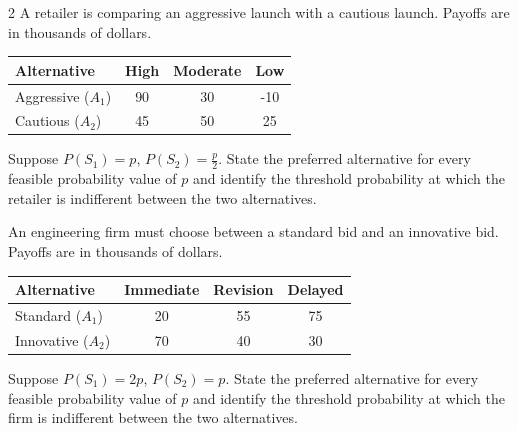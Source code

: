 \begin{multicols}{2}
		A retailer is comparing an aggressive launch with a cautious launch. Payoffs are in thousands of dollars.
		\begin{center}\setlength{\tabcolsep}{2pt}\renewcommand{\arraystretch}{1.15}
			\begin{tabular}{lccc}\toprule
				Alternative&High&Moderate&Low\\ \midrule
				Aggressive ($A_1$)&90&30&-10\\
				Cautious ($A_2$)&45&50&25\\ \bottomrule
			\end{tabular}
		\end{center}\vspace{-3mm}
		Suppose $P(S_1)=p$, $P(S_2)=\frac{p}{2}$. State the preferred alternative for every feasible probability value of $p$ and identify the threshold probability at which the retailer is indifferent between the two alternatives.
		
		An engineering firm must choose between a standard bid and an innovative bid. Payoffs are in thousands of dollars.
		\begin{center}\setlength{\tabcolsep}{2pt}\renewcommand{\arraystretch}{1.15}
			\begin{tabular}{lccc}\toprule
				Alternative&Immediate&Revision&Delayed\\ \midrule
				Standard ($A_1$)&20&55&75\\
				Innovative ($A_2$)&70&40&30\\ \bottomrule
			\end{tabular}
		\end{center}\vspace{-3mm}
		Suppose $P(S_1)=2p$, $P(S_2)=p$. State the preferred alternative for every feasible probability value of $p$ and identify the threshold probability at which the firm is indifferent between the two alternatives.
		
		
	\end{multicols}


